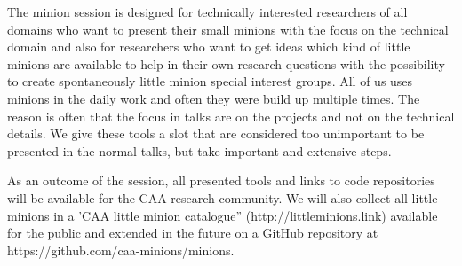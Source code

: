 \documentclass[a4paper]{article}
\begin{document}
The minion session is designed for technically interested researchers of all domains who want to present their small minions with the focus on the technical domain and also for researchers who want to get ideas which kind of little minions are available to help in their own research questions with the possibility to create spontaneously little minion special interest groups. All of us uses minions in the daily work and often they were build up multiple times. The reason is often that the focus in talks are on the projects and not on the technical details. We give these tools a slot that are considered too unimportant to be presented in the normal talks, but take important and extensive steps.

As an outcome of the session, all presented tools and links to code repositories will be available for the CAA research community. We will also collect all little minions in a 'CAA little minion catalogue” (http://littleminions.link) available for the public and extended in the future on a GitHub repository at https://github.com/caa-minions/minions.



\end{document}
